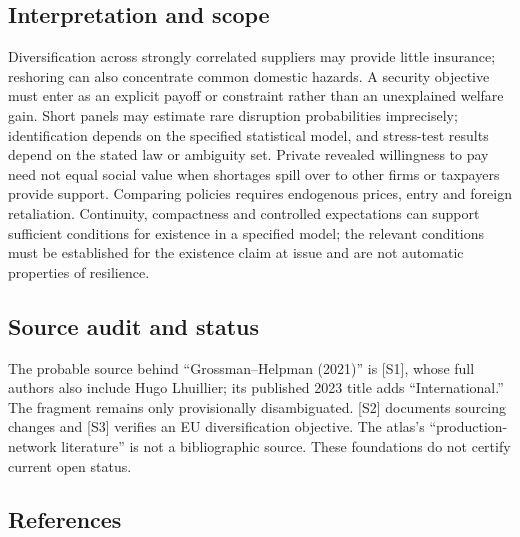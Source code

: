 \documentclass[11pt,a4paper]{article}
\begin{document}
\subsection*{Interpretation and scope}
Diversification across strongly correlated suppliers may provide little insurance; reshoring can also concentrate common domestic hazards. A security objective must enter as an explicit payoff or constraint rather than an unexplained welfare gain. Short panels may estimate rare disruption probabilities imprecisely; identification depends on the specified statistical model, and stress-test results depend on the stated law or ambiguity set. Private revealed willingness to pay need not equal social value when shortages spill over to other firms or taxpayers provide support. Comparing policies requires endogenous prices, entry and foreign retaliation. Continuity, compactness and controlled expectations can support sufficient conditions for existence in a specified model; the relevant conditions must be established for the existence claim at issue and are not automatic properties of resilience.

\subsection*{Source audit and status}
The probable source behind ``Grossman–Helpman (2021)'' is [S1], whose full authors also include Hugo Lhuillier; its published 2023 title adds ``International.'' The fragment remains only provisionally disambiguated. [S2] documents sourcing changes and [S3] verifies an EU diversification objective. The atlas’s ``production-network literature'' is not a bibliographic source. These foundations do not certify current open status.

\subsection*{References}
\end{document}
